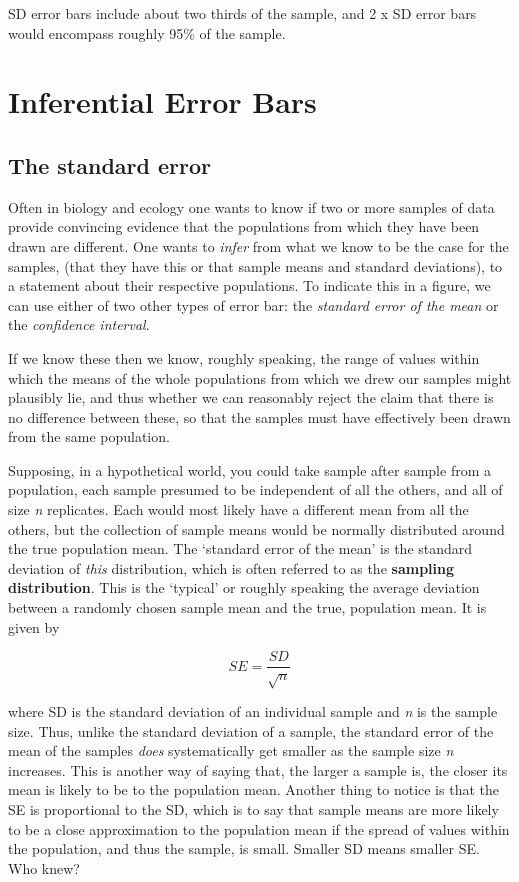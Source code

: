 \documentclass[
  letterpaper,
  DIV=11,
  numbers=noendperiod]{scrreprt}
\begin{document}
SD error bars include about two thirds of the sample, and 2 x SD error
bars would encompass roughly 95\% of the sample.

\section{Inferential Error Bars}\label{inferential-error-bars}

\subsection{The standard error}\label{the-standard-error}

Often in biology and ecology one wants to know if two or more samples of
data provide convincing evidence that the populations from which they
have been drawn are different. One wants to \emph{infer} from what we
know to be the case for the samples, (that they have this or that sample
means and standard deviations), to a statement about their respective
populations. To indicate this in a figure, we can use either of two
other types of error bar: the \emph{standard error of the mean} or the
\emph{confidence interval}.

If we know these then we know, roughly speaking, the range of values
within which the means of the whole populations from which we drew our
samples might plausibly lie, and thus whether we can reasonably reject
the claim that there is no difference between these, so that the samples
must have effectively been drawn from the same population.

Supposing, in a hypothetical world, you could take sample after sample
from a population, each sample presumed to be independent of all the
others, and all of size \emph{n} replicates. Each would most likely have
a different mean from all the others, but the collection of sample means
would be normally distributed around the true population mean. The
`standard error of the mean' is the standard deviation of \emph{this}
distribution, which is often referred to as the \textbf{sampling
distribution}. This is the `typical' or roughly speaking the average
deviation between a randomly chosen sample mean and the true, population
mean. It is given by

\[SE = \frac{SD}{\sqrt{n}} \]

where SD is the standard deviation of an individual sample and \emph{n}
is the sample size. Thus, unlike the standard deviation of a sample, the
standard error of the mean of the samples \emph{does} systematically get
smaller as the sample size \emph{n} increases. This is another way of
saying that, the larger a sample is, the closer its mean is likely to be
to the population mean. Another thing to notice is that the SE is
proportional to the SD, which is to say that sample means are more
likely to be a close approximation to the population mean if the spread
of values within the population, and thus the sample, is small. Smaller
SD means smaller SE. Who knew?
\end{document}
